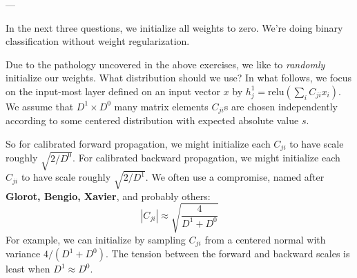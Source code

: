 \documentclass[11pt, justified]{tufte-book}
\newcommand{\samsubsubsection}[1]{
   \vspace{0.1cm}
   \par\noindent{\hspace{-2cm}\normalsize \sc \gre #1} ---
}
\theoremstyle{definition}
\begin{document}
        \newpage
      \samsubsubsection{initialization}
        In the next three questions, we initialize all weights to zero.  We're
        doing binary classification without weight regularization.

        Due to the pathology
        uncovered in the above exercises, we like to \emph{randomly} initialize
        our weights.
        What distribution should we use?
        In what follows, we focus on the input-most layer defined on an input
        vector $x$ by $h^1_j = \text{relu}\left(\sum_i C_{ji} x_i \right)$.  We
        assume that $D^1 \times D^0$ many matrix elements $C_{ji}$s are chosen
        independently according to some centered distribution with expected
        absolute value $s$.   

        So for calibrated forward propagation, we might initialize each $C_{ji}$
        to have scale roughly $\sqrt{2/D^0}$.
        For calibrated backward propagation, we might initialize each $C_{ji}$
        to have scale roughly $\sqrt{2/D^1}$.
        We often use a compromise, named after \textbf{Glorot, Bengio, Xavier},
        and probably others:
        $$
            |C_{ji}| \approx \sqrt{\frac{4}{D^1+D^0}}
        $$
        For example, we can initialize by sampling $C_{ji}$ from a centered
        normal with variance $4/(D^1+D^0)$.  The tension between the forward
        and backward scales is least when $D^1 \approx D^0$.

\end{document}
